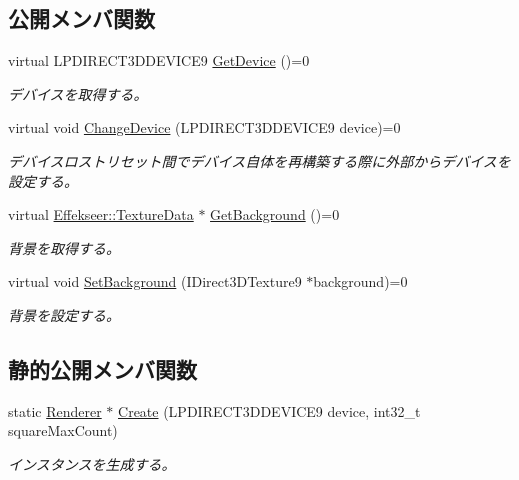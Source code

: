 \subsection*{公開メンバ関数}
\begin{DoxyCompactItemize}
\item 
virtual L\+P\+D\+I\+R\+E\+C\+T3\+D\+D\+E\+V\+I\+C\+E9 \mbox{\hyperlink{class_effekseer_renderer_d_x9_1_1_renderer_a41c5637f9dcf5341d12b9b61ee46bd74}{Get\+Device}} ()=0
\begin{DoxyCompactList}\small\item\em デバイスを取得する。 \end{DoxyCompactList}\item 
virtual void \mbox{\hyperlink{class_effekseer_renderer_d_x9_1_1_renderer_a08f6d85779736243059040d86c573df8}{Change\+Device}} (L\+P\+D\+I\+R\+E\+C\+T3\+D\+D\+E\+V\+I\+C\+E9 device)=0
\begin{DoxyCompactList}\small\item\em デバイスロストリセット間でデバイス自体を再構築する際に外部からデバイスを設定する。 \end{DoxyCompactList}\item 
virtual \mbox{\hyperlink{struct_effekseer_1_1_texture_data}{Effekseer\+::\+Texture\+Data}} $\ast$ \mbox{\hyperlink{class_effekseer_renderer_d_x9_1_1_renderer_a98f5bc52650df1982e9fb75b3c735d65}{Get\+Background}} ()=0
\begin{DoxyCompactList}\small\item\em 背景を取得する。 \end{DoxyCompactList}\item 
virtual void \mbox{\hyperlink{class_effekseer_renderer_d_x9_1_1_renderer_a4ba4636b187f74288fdd6ff68071196d}{Set\+Background}} (I\+Direct3\+D\+Texture9 $\ast$background)=0
\begin{DoxyCompactList}\small\item\em 背景を設定する。 \end{DoxyCompactList}\end{DoxyCompactItemize}
\subsection*{静的公開メンバ関数}
\begin{DoxyCompactItemize}
\item 
static \mbox{\hyperlink{class_effekseer_renderer_d_x9_1_1_renderer}{Renderer}} $\ast$ \mbox{\hyperlink{class_effekseer_renderer_d_x9_1_1_renderer_aadd9f57a16e8291dccd27d2e1c03edc4}{Create}} (L\+P\+D\+I\+R\+E\+C\+T3\+D\+D\+E\+V\+I\+C\+E9 device, int32\+\_\+t square\+Max\+Count)
\begin{DoxyCompactList}\small\item\em インスタンスを生成する。 \end{DoxyCompactList}\end{DoxyCompactItemize}

